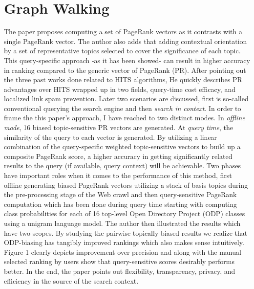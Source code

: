 \documentclass[a4paper,12pt]{article}
\begin{document}
\section{Graph Walking}
The paper proposes computing a set of PageRank vectors as it contrasts with a single PageRank vector. The author also adds that adding contextual orientation by a set of representative topics selected to cover the significance of each topic. This query-specific approach -as it has been showed- can result in higher accuracy in ranking compared to the generic vector of PageRank (PR). After pointing out the three past works done related to HITS algorithms, He quickly describes PR advantages over HITS wrapped up in two fields, query-time cost efficacy, and localized link spam prevention. Later two scenarios are discussed, first is so-called conventional querying the search engine and then \textit{search in context}. In order to frame the this paper's approach, I have reached to two distinct modes. In \textit{offline mode}, 16 biased topic-sensitive PR vectors are generated. At \textit{query time}, the similarity of the query to each vector is generated. By utilizing a linear combination of the query-specific weighted topic-sensitive vectors to build up a composite PageRank score, a higher accuracy in getting significantly related results to the query (if available, query context) will be achievable. Two phases have important roles when it comes to the performance of this method, first offline generating biased PageRank vectors utilizing a stack of basis topics during the pre-processing stage of the Web crawl and then query-sensitive PageRank computation which has been done during query time starting with computing class probabilities for each of 16 top-level Open Directory Project (ODP) classes using a unigram language model. The author then illustrated the results which have two scopes. By studying the pairwise topically-biased results we realize that ODP-biasing has tangibly improved rankings which also makes sense intuitively. Figure 1 clearly depicts improvement over precision and along with the manual selected ranking by users show that query-sensitive scores desirably performs better. In the end, the paper points out flexibility, transparency, privacy, and efficiency in the source of the search context.
\end{document}
